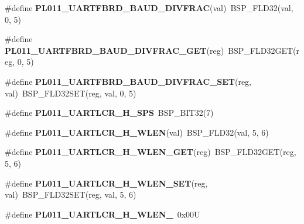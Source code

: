 \begin{DoxyCompactItemize}
\item 
\mbox{\label{arm-pl011-regs_8h_af6c22a2492ea96008db348557cd268ad}} 
\#define {\bfseries P\+L011\+\_\+\+U\+A\+R\+T\+F\+B\+R\+D\+\_\+\+B\+A\+U\+D\+\_\+\+D\+I\+V\+F\+R\+AC}(val)~B\+S\+P\+\_\+\+F\+L\+D32(val, 0, 5)
\item 
\mbox{\label{arm-pl011-regs_8h_a026f926f02375c35365bd85294713322}} 
\#define {\bfseries P\+L011\+\_\+\+U\+A\+R\+T\+F\+B\+R\+D\+\_\+\+B\+A\+U\+D\+\_\+\+D\+I\+V\+F\+R\+A\+C\+\_\+\+G\+ET}(reg)~B\+S\+P\+\_\+\+F\+L\+D32\+G\+ET(reg, 0, 5)
\item 
\mbox{\label{arm-pl011-regs_8h_aad16c211db2606ee287542dc3863ff25}} 
\#define {\bfseries P\+L011\+\_\+\+U\+A\+R\+T\+F\+B\+R\+D\+\_\+\+B\+A\+U\+D\+\_\+\+D\+I\+V\+F\+R\+A\+C\+\_\+\+S\+ET}(reg,  val)~B\+S\+P\+\_\+\+F\+L\+D32\+S\+ET(reg, val, 0, 5)
\item 
\mbox{\label{arm-pl011-regs_8h_a877ff79374e3da77b080daed767d785e}} 
\#define {\bfseries P\+L011\+\_\+\+U\+A\+R\+T\+L\+C\+R\+\_\+\+H\+\_\+\+S\+PS}~B\+S\+P\+\_\+\+B\+I\+T32(7)
\item 
\mbox{\label{arm-pl011-regs_8h_aa81ba614a1c94acc26aa4d1b142c8518}} 
\#define {\bfseries P\+L011\+\_\+\+U\+A\+R\+T\+L\+C\+R\+\_\+\+H\+\_\+\+W\+L\+EN}(val)~B\+S\+P\+\_\+\+F\+L\+D32(val, 5, 6)
\item 
\mbox{\label{arm-pl011-regs_8h_a287f7c516f58ac66eb9a5187dad8df72}} 
\#define {\bfseries P\+L011\+\_\+\+U\+A\+R\+T\+L\+C\+R\+\_\+\+H\+\_\+\+W\+L\+E\+N\+\_\+\+G\+ET}(reg)~B\+S\+P\+\_\+\+F\+L\+D32\+G\+ET(reg, 5, 6)
\item 
\mbox{\label{arm-pl011-regs_8h_a07bc284c0b9e20900094bb497aec2a2c}} 
\#define {\bfseries P\+L011\+\_\+\+U\+A\+R\+T\+L\+C\+R\+\_\+\+H\+\_\+\+W\+L\+E\+N\+\_\+\+S\+ET}(reg,  val)~B\+S\+P\+\_\+\+F\+L\+D32\+S\+ET(reg, val, 5, 6)
\item 
\mbox{\label{arm-pl011-regs_8h_a41377a852a5532dcf3d00eb043887338}} 
\#define {\bfseries P\+L011\+\_\+\+U\+A\+R\+T\+L\+C\+R\+\_\+\+H\+\_\+\+W\+L\+E\+N\+\_}~0x00U
\item 
\mbox{\label{arm-pl011-regs_8h_a3ac387f5c712b297167ef6a2e25ffe15}} 

\end{DoxyCompactItemize}
